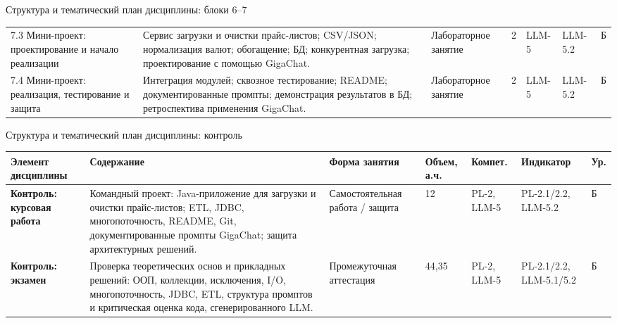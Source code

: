 \documentclass[aspectratio=169,10pt]{beamer}
\newcommand{\smallgap}{\vspace{0.35em}}
\begin{document}
\begin{frame}{Структура и тематический план дисциплины: блоки 6--7}
\begin{adjustbox}{max width=\textwidth,max totalheight=0.84\textheight,center}
\begin{tabular}{L{5.0cm} L{6.5cm} L{1.8cm} C{0.7cm} C{1.0cm} C{1.1cm} C{0.5cm}}
7.3 Мини-проект: проектирование и начало реализации & Сервис загрузки и очистки прайс-листов; CSV/JSON; нормализация валют; обогащение; БД; конкурентная загрузка; проектирование с помощью GigaChat. & Лабораторное занятие & 2 & LLM-5 & LLM-5.2 & Б\\
7.4 Мини-проект: реализация, тестирование и защита & Интеграция модулей; сквозное тестирование; README; документированные промпты; демонстрация результатов в БД; ретроспектива применения GigaChat. & Лабораторное занятие & 2 & LLM-5 & LLM-5.2 & Б\\
\bottomrule
\end{tabular}
\end{adjustbox}
\end{frame}

\begin{frame}{Структура и тематический план дисциплины: контроль}
\small
\begin{adjustbox}{max width=\textwidth,max totalheight=0.68\textheight,center}
\begin{tabular}{L{4.5cm} L{6.0cm} L{3.0cm} C{1.0cm} C{1.0cm} C{1.8cm} C{0.7cm}}
\toprule
\textbf{Элемент дисциплины} & \textbf{Содержание} & \textbf{Форма занятия} & \textbf{Объем, а.ч.} & \textbf{Компет.} & \textbf{Индикатор} & \textbf{Ур.} \\
\midrule
\textbf{Контроль: курсовая работа} & Командный проект: Java-приложение для загрузки и очистки прайс-листов; ETL, JDBC, многопоточность, README, Git, документированные промпты GigaChat; защита архитектурных решений. & Самостоятельная работа / защита & 12 & PL-2, LLM-5 & PL-2.1/2.2, LLM-5.2 & Б\\
\midrule
\textbf{Контроль: экзамен} & Проверка теоретических основ и прикладных решений: ООП, коллекции, исключения, I/O, многопоточность, JDBC, ETL, структура промптов и критическая оценка кода, сгенерированного LLM. & Промежуточная аттестация & 44,35 & PL-2, LLM-5 & PL-2.1/2.2, LLM-5.1/5.2 & Б\\
\bottomrule
\end{tabular}
\end{adjustbox}
\smallgap
\end{frame}
\end{document}
